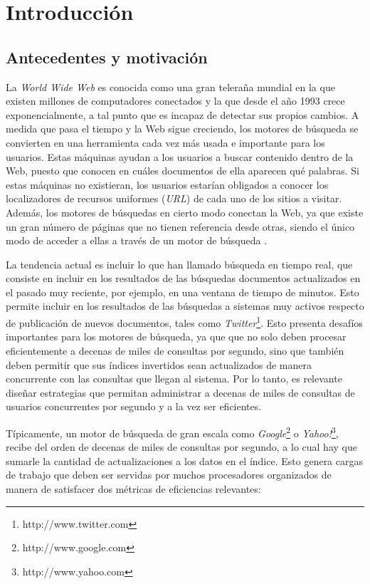 \chapter{Introducci\'on}
\label{cap:intro}


\section{Antecedentes y motivaci\'on}
\label{intro:motivacion}
La \textit{World Wide Web} es conocida como una gran teleraña mundial en la que existen millones de computadores conectados y la que desde el año 1993 crece exponencialmente, a tal punto que es incapaz de detectar sus propios cambios. A medida que pasa el tiempo y la Web sigue creciendo, los motores de búsqueda se convierten en una herramienta cada vez más usada e importante para los usuarios. Estas máquinas ayudan a los usuarios a buscar contenido dentro de la Web, puesto que conocen en cuáles documentos de ella aparecen qué palabras. Si estas máquinas no existieran, los usuarios estarían obligados a conocer los localizadores de recursos uniformes (\textit{URL}) de cada uno de los sitios a visitar. Además, los motores de búsquedas en cierto modo conectan la Web, ya que existe un gran número de páginas que no tienen referencia desde otras, siendo el único modo de acceder a ellas a través de un motor de búsqueda \citep{Baeza-Yates:2008}.  

La tendencia actual es incluir lo que han llamado búsqueda en tiempo real, que consiste en incluir en los resultados de las búsquedas documentos actualizados en el pasado muy reciente, por ejemplo, en una ventana de tiempo de minutos. Esto permite incluir en los resultados de las búsquedas a sistemas muy activos respecto de publicación de nuevos documentos, tales como \textit{Twitter}\footnote{http://www.twitter.com}. Esto presenta desafíos importantes para los motores de búsqueda, ya que que no solo deben procesar eficientemente a decenas de miles de consultas por segundo, sino que también deben permitir que sus índices invertidos \citep{Zobel:2006} sean actualizados de manera concurrente con las consultas que llegan al sistema. Por lo tanto, es relevante diseñar estrategias que permitan administrar a decenas de miles de consultas de usuarios concurrentes por segundo y a la vez ser eficientes.

Típicamente, un motor de búsqueda de gran escala como \textit{Google}\footnote{http://www.google.com} o \textit{Yahoo!}\footnote{http://www.yahoo.com}, recibe del orden de decenas de miles de consultas por segundo, a lo cual hay que sumarle la cantidad de actualizaciones a los datos en el índice. Esto genera cargas de trabajo que deben ser servidas por muchos procesadores organizados de manera de satisfacer dos métricas de eficiencias relevantes:

